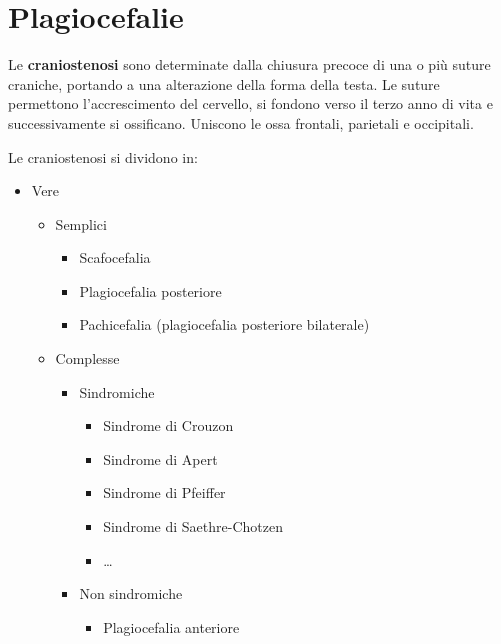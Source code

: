 \chapter{Plagiocefalie}
Le \textbf{craniostenosi} sono determinate dalla chiusura precoce di una o più suture craniche, portando a una alterazione della forma
della testa. Le suture permettono l'accrescimento del cervello, si fondono verso il terzo anno di vita e successivamente si ossificano.
Uniscono le ossa frontali, parietali e occipitali.

Le craniostenosi si dividono in:
\begin{itemize}																							%
\item Vere																								%
	\begin{itemize}																						%
	\item Semplici																						%
		\begin{itemize}																					%
		\item Scafocefalia																				%
		\item Plagiocefalia posteriore																	%
		\item Pachicefalia (plagiocefalia posteriore bilaterale)										%
		\end{itemize}																					%
	\item Complesse																						%
		\begin{itemize}																					%
		\item Sindromiche																				%
			\begin{itemize}																				%
			\item Sindrome di Crouzon																	%
			\item Sindrome di Apert																	%
			\item Sindrome di Pfeiffer																	%
			\item Sindrome di Saethre-Chotzen														%
			\item \dots																					%
			\end{itemize}																				%
		\item Non sindromiche																			%
			\begin{itemize}																				%
			\item Plagiocefalia anteriore																%

\end{itemize}
\end{itemize}
\end{itemize}
\end{itemize}
